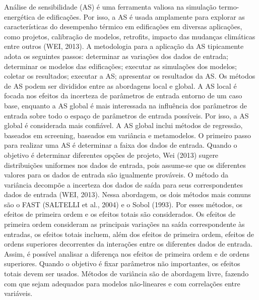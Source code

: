 \documentclass[brazil,hardcopy,openany,a5paper]{ufscthesis}
\begin{document}
	Análise de sensibilidade (AS) é uma ferramenta valiosa na simulação termo-energética de edificações. Por isso, a AS é usada amplamente para explorar as características do desempenho térmico em edificações em diversas aplicações, como projetos, calibração de modelos, retrofits, impacto das mudanças climáticas entre outros (WEI, 2013). A metodologia para a aplicação da AS tipicamente adota os seguintes passos: determinar as variações dos dados de entrada; determinar os modelos das edificações; executar as simulações dos modelos; coletar os resultados; executar a AS; apresentar os resultados da AS. Os métodos de AS podem ser divididos entre as abordagens local e global. A AS local é focada nos efeitos da incerteza de parâmetros de entrada entorno de um caso base, enquanto a AS global é mais interessada na influência dos parâmetros de entrada sobre todo o espaço de parâmetros de entrada possíveis. Por isso, a AS global é considerada mais confiável. A AS global inclui métodos de regressão, baseados em screening, baseados em variância e metamodelos.
	O primeiro passo para realizar uma AS é determinar a faixa dos dados de entrada. Quando o objetivo é determinar diferentes opções de projeto, Wei (2013) sugere distribuições uniformes nos dados de entrada, pois assume-se que os diferentes valores para os dados de entrada são igualmente prováveis.
	O método da variância decompõe a incerteza dos dados de saída para seus correspondentes dados de entrada (WEI, 2013). Nessa abordagem, os dois métodos mais comuns são o FAST (SALTELLI et al., 2004) e o Sobol (1993). Por esses métodos, os efeitos de primeira ordem e os efeitos totais são considerados. Os efeitos de primeira ordem consideram as principais variações na saída correspondente às entradas, os efeitos totais incluem, além dos efeitos de primeira ordem, efeitos de ordens superiores decorrentes da interações entre os diferentes dados de entrada. Assim, é possível analisar a diferença nos efeitos de primeira ordem e de ordens superiores. Quando o objetivo é fixar parâmetros não importantes, os efeitos totais devem ser usados. Métodos de variância são de abordagem livre, fazendo com que sejam adequados para modelos não-lineares e com correlações entre variáveis.
	
\end{document}
